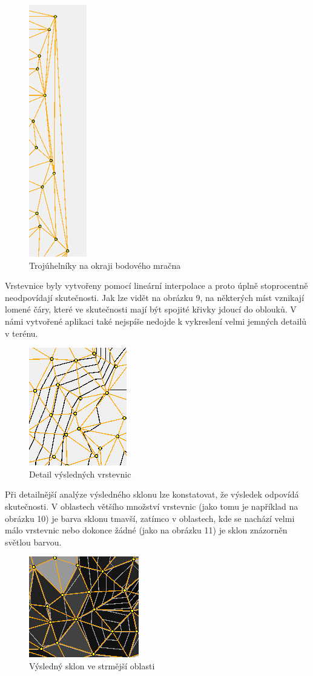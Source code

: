 \documentclass{article}
\begin{document}
\begin{spacing}{1.5}
\begin{figure}[htbp]
    \centering
    \includegraphics[width=0.1\linewidth]{images/08trojuhelnik_okraj.png}
    \caption{Trojúhelníky na okraji bodového mračna}
    \label{fig:enter-label}
\end{figure}

\newpage
Vrstevnice byly vytvořeny pomocí lineární interpolace a proto úplně stoprocentně neodpovídají skutečnosti. Jak lze vidět na obrázku 9, na některých míst vznikají lomené čáry, které ve skutečnosti mají být spojité křivky jdoucí do oblouků. V námi vytvořené aplikaci také nejspíše nedojde k vykreslení velmi jemných detailů v terénu.

\begin{figure}[htbp]
    \centering
    \includegraphics[width=0.3\linewidth]{images/09detail_vrstevnic.png}
    \caption{Detail výsledných vrstevnic}
    \label{fig:enter-label}
\end{figure}

Při detailnější analýze výsledného sklonu lze konstatovat, že výsledek odpovídá skutečnosti. V oblastech většího množství vrstevnic (jako tomu je například na obrázku 10) je barva sklonu tmavší, zatímco v oblastech, kde se nachází velmi málo vrstevnic nebo dokonce žádné (jako na obrázku 11) je sklon znázorněn světlou barvou.

\begin{figure}[htbp]
    \centering
    \includegraphics[width=0.3\linewidth]{images/10sklon.png}
    \caption{Výsledný sklon ve strmější oblasti}
    \label{fig:enter-label}
\end{figure}


\end{spacing}
\end{document}
